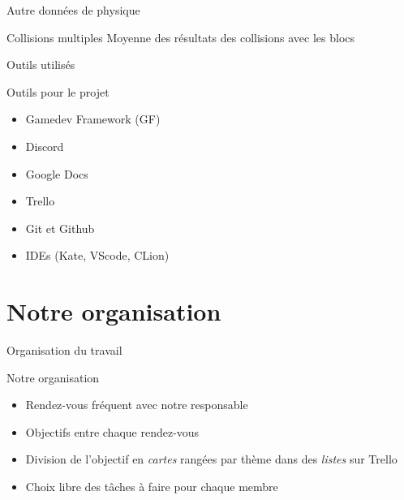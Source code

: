 \documentclass{beamer}
\begin{document}
{\begin{frame}{Autre données de physique}
    \begin{block}{Collisions multiples}
        Moyenne des résultats des collisions avec les blocs
    \end{block}
\end{frame}

\begin{frame}{Outils utilisés}
    \begin{block}{Outils pour le projet}
        \begin{itemize}
            \item[\bullet] Gamedev Framework (GF)
            \item[\bullet] Discord
            \item[\bullet] Google Docs
            \item[\bullet] Trello
            \item[\bullet] Git et Github
            \item[\bullet] IDEs (Kate, VScode, CLion)
        \end{itemize}
    \end{block}
\end{frame}

\section{Notre organisation}
\begin{frame}{Organisation du travail}
    \begin{block}{Notre organisation}
        \begin{itemize}
            \item[\bullet] Rendez-vous fréquent avec notre responsable
            \item[\bullet] Objectifs entre chaque rendez-vous
            \item[\bullet] Division de l'objectif en \emph{cartes} rangées par thème dans des \emph{listes} sur Trello
            \item[\bullet] Choix libre des tâches à faire pour chaque membre
        \end{itemize}
    \end{block}
\end{frame}

}
\end{document}
